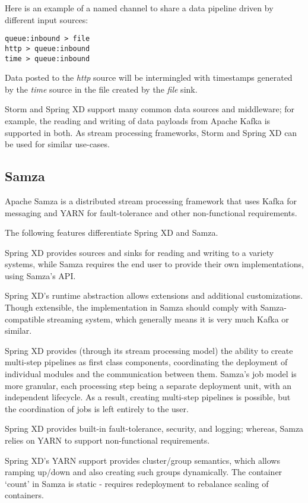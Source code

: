 Here is an example of a named channel to share a data pipeline driven
by different input sources:

\begin{lstlisting}
queue:inbound > file
http > queue:inbound
time > queue:inbound
\end{lstlisting}

Data posted to the \emph{http} source will be intermingled with timestamps
generated by the \emph{time} source in the file created by the \emph{file}
sink.

Storm and Spring XD support many common data sources and middleware;
for example, the reading and writing of data payloads from Apache Kafka
is supported in both. As stream processing frameworks, Storm and Spring
XD can be used for similar use-cases.

\subsection{Samza}
Apache Samza\cite{samza} is a distributed stream processing framework that uses
Kafka for messaging and YARN for fault-tolerance and other non-functional
requirements.

The following features differentiate Spring XD and Samza.

\begin{itemize*}
\item Spring XD provides sources and sinks for reading and writing to a
variety systems, while Samza requires the end user to provide their
own implementations, using Samza's API.
\item Spring XD's runtime abstraction allows extensions and additional
customizations. Though extensible, the implementation in Samza should comply with
Samza-compatible streaming system, which generally means it is very much Kafka
or similar.
\item Spring XD provides (through its stream processing model) the ability to
create multi-step pipelines as first class components, coordinating the deployment of individual
modules and the communication between them. Samza's job model is more granular, each
processing step being a separate deployment unit, with an independent lifecycle.
As a result, creating multi-step pipelines is possible, but the coordination of
jobs is left entirely to the user.
\item Spring XD provides built-in fault-tolerance, security, and logging; whereas,
Samza relies on YARN to support non-functional requirements.
\item Spring XD's YARN support provides cluster/group semantics, which allows
ramping up/down and also creating such groups dynamically. The container `count'
in Samza is static - requires redeployment to rebalance scaling of containers.
\end{itemize*}

